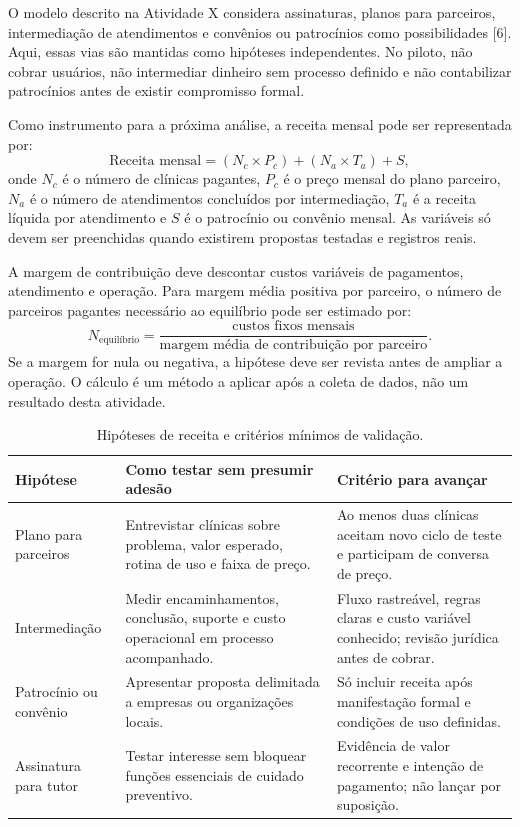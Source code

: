 \documentclass[12pt,a4paper]{article}
\begin{document}
O modelo descrito na Atividade X considera assinaturas, planos para parceiros, intermediação de atendimentos e convênios ou patrocínios como possibilidades [6]. Aqui, essas vias são mantidas como hipóteses independentes. No piloto, não cobrar usuários, não intermediar dinheiro sem processo definido e não contabilizar patrocínios antes de existir compromisso formal.

Como instrumento para a próxima análise, a receita mensal pode ser representada por:
\[
\text{Receita mensal} = (N_c \times P_c) + (N_a \times T_a) + S,
\]
onde $N_c$ é o número de clínicas pagantes, $P_c$ é o preço mensal do plano parceiro, $N_a$ é o número de atendimentos concluídos por intermediação, $T_a$ é a receita líquida por atendimento e $S$ é o patrocínio ou convênio mensal. As variáveis só devem ser preenchidas quando existirem propostas testadas e registros reais.

A margem de contribuição deve descontar custos variáveis de pagamentos, atendimento e operação. Para margem média positiva por parceiro, o número de parceiros pagantes necessário ao equilíbrio pode ser estimado por:
\[
N_{\text{equilíbrio}} = \frac{\text{custos fixos mensais}}{\text{margem média de contribuição por parceiro}}.
\]
Se a margem for nula ou negativa, a hipótese deve ser revista antes de ampliar a operação. O cálculo é um método a aplicar após a coleta de dados, não um resultado desta atividade.

\begin{table}[H]
\centering
\small
\caption{Hipóteses de receita e critérios mínimos de validação.}
\begin{tabularx}{\textwidth}{P{3.0cm}YY}
\toprule
\textbf{Hipótese} & \textbf{Como testar sem presumir adesão} & \textbf{Critério para avançar} \\
\midrule
Plano para parceiros & Entrevistar clínicas sobre problema, valor esperado, rotina de uso e faixa de preço. & Ao menos duas clínicas aceitam novo ciclo de teste e participam de conversa de preço. \\
Intermediação & Medir encaminhamentos, conclusão, suporte e custo operacional em processo acompanhado. & Fluxo rastreável, regras claras e custo variável conhecido; revisão jurídica antes de cobrar. \\
Patrocínio ou convênio & Apresentar proposta delimitada a empresas ou organizações locais. & Só incluir receita após manifestação formal e condições de uso definidas. \\
Assinatura para tutor & Testar interesse sem bloquear funções essenciais de cuidado preventivo. & Evidência de valor recorrente e intenção de pagamento; não lançar por suposição. \\
\bottomrule
\end{tabularx}
\end{table}
\end{document}
